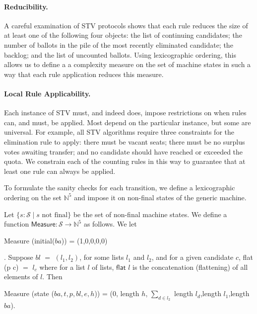 \documentclass{llncs}
\begin{document}
\paragraph{Reducibility.} 
A careful examination of STV protocols shows that each rule
reduces the size of at least one of the following four
objects: the list of continuing candidates; the number of 
ballots in the pile of the most recently eliminated candidate;  the
backlog; and the list of uncounted ballots. Using lexicographic
ordering, this allows us to define a 
a complexity measure on the set of
machine states in such a way that each rule application reduces this
measure. 

\paragraph{Local Rule Applicability.}
Each instance of STV must, and indeed does, impose 
restrictions on when rules can, and must, be applied. Most
depend on the particular instance, but some
are universal. For example, all STV
algorithms require three constraints for the elimination
rule to apply: there must be vacant seats; there must be
no surplus votes awaiting transfer; and no candidate should have
reached or exceeded the quota. We constrain each of the counting
rules in this way to guarantee that at least one rule can always be
applied. 

To formulate the sanity checks for each transition, we 
define a lexicographic ordering on the set 
$\mathbb{N}^5$
and impose it on non-final states of the generic machine.   

\begin{definition} \label{defn:measure}
Let $\{s: \mathcal{S} \mid s\mbox{ not final}\}$ be the set of
non-final machine states. We define a function $\mathsf{Measure}:
\mathcal{S} \to
\mathbb{N}^5$ as follows. We let
\begin{small}\textsf{Measure} (\textsf{initial}($ba$)) =
(1,0,0,0,0)\end{small}. Suppose $bl$ $=$ $(l_{1},l_{2})$, for some
lists $l_{1}$ and $l_{2}$, and for a given candidate $c$,
\textsf{flat} (p c) $=$ $l_{c}$ where for a list $l$ of lists,  $\mathsf{flat}$ $l$ is the
concatenation (flattening) of all elements of $l$. Then
\begin{small}
\begin{center}
 \textsf{Measure} (\textsf{state} ($ba,t,p,bl,e,h$)) = (0,
 \textsf{length} $h$, $\sum_{d\in l_{2}}^{}$ \textsf{length}
 $l_{d}$,\textsf{length} $l_{1}$,\textsf{length}  $ba$).
\end{center}
\end{small}
\end{definition}
\end{document}
